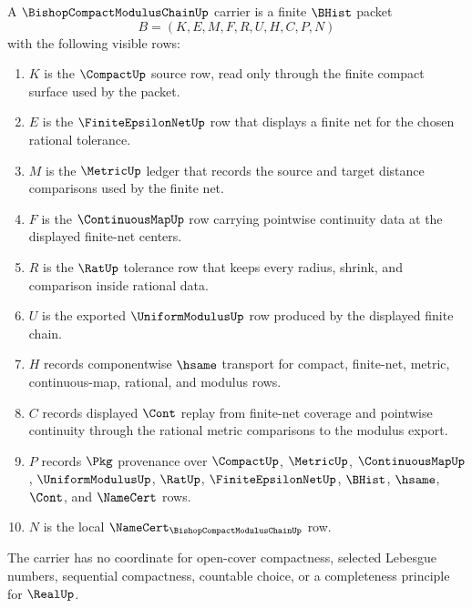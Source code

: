 \begin{definition}
\label{def:bishop-compact-modulus-chain-carrier}
A $\BishopCompactModulusChainUp$ carrier is a finite $\BHist$ packet
$$
B=(K,E,M,F,R,U,H,C,P,N)
$$
with the following visible rows:
\begin{enumerate}
\item $K$ is the $\CompactUp$ source row, read only through the finite compact surface used by the packet.
\item $E$ is the $\FiniteEpsilonNetUp$ row that displays a finite net for the chosen rational tolerance.
\item $M$ is the $\MetricUp$ ledger that records the source and target distance comparisons used by the finite net.
\item $F$ is the $\ContinuousMapUp$ row carrying pointwise continuity data at the displayed finite-net centers.
\item $R$ is the $\RatUp$ tolerance row that keeps every radius, shrink, and comparison inside rational data.
\item $U$ is the exported $\UniformModulusUp$ row produced by the displayed finite chain.
\item $H$ records componentwise $\hsame$ transport for compact, finite-net, metric, continuous-map, rational, and modulus rows.
\item $C$ records displayed $\Cont$ replay from finite-net coverage and pointwise continuity through the rational metric comparisons to the modulus export.
\item $P$ records $\Pkg$ provenance over $\CompactUp$, $\MetricUp$, $\ContinuousMapUp$, $\UniformModulusUp$, $\RatUp$, $\FiniteEpsilonNetUp$, $\BHist$, $\hsame$, $\Cont$, and $\NameCert$ rows.
\item $N$ is the local $\NameCert_{\BishopCompactModulusChainUp}$ row.
\end{enumerate}
The carrier has no coordinate for open-cover compactness, selected Lebesgue numbers, sequential compactness, countable choice, or a completeness principle for $\RealUp$.
\end{definition}


